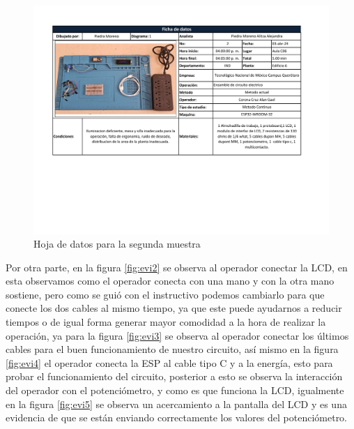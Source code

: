     \begin{figure}[H]
        \centering
        \includegraphics[trim = {17mm 70mm 25mm 15mm},clip,scale=0.36]{22/Img/hojaDeDatos2.pdf}
        \caption{Hoja de datos para la segunda muestra}
        \label{fig:hoja2}
    \end{figure}
    
     
     Por otra parte, en la figura \ref{fig:evi2} se observa al operador conectar la LCD, en esta observamos como el operador conecta con una mano y con la otra mano sostiene, pero como se guió con el instructivo podemos cambiarlo para que conecte los dos cables al mismo tiempo, ya que este puede ayudarnos a reducir tiempos o de igual forma generar mayor comodidad a la hora de realizar la operación, ya para la figura \ref{fig:evi3} se observa  al operador conectar los últimos cables para el buen funcionamiento de nuestro circuito, así mismo en la figura \ref{fig:evi4} el operador conecta la ESP al cable tipo C y a la energía, esto para probar el funcionamiento del circuito, posterior a esto se observa la interacción del operador con el potenciómetro, y como es que funciona la LCD, igualmente en la figura \ref{fig:evi5} se observa un acercamiento a la pantalla del LCD y es una evidencia de que se están enviando correctamente los valores del potenciómetro.
    
